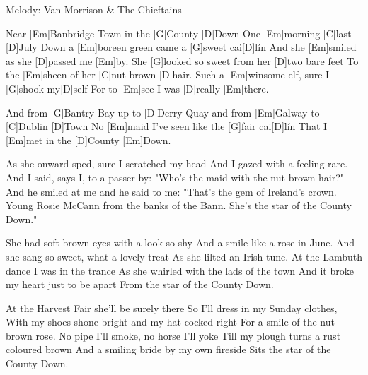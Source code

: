 Melody: Van Morrison \& The Chieftains


\begin{guitar}
	Near [Em]Banbridge Town in the [G]County [D]Down
	One [Em]morning [C]last [D]July
	Down a [Em]boreen green came a [G]sweet cai[D]lín
	And she [Em]smiled as she [D]passed me [Em]by.
	She [G]looked so sweet from her [D]two bare feet
	To the [Em]sheen of her [C]nut brown [D]hair.
	Such a [Em]winsome elf, sure I [G]shook my[D]self
	For to [Em]see I was [D]really [Em]there.
	
	And from [G]Bantry Bay up to [D]Derry Quay
	and from [Em]Galway to [C]Dublin [D]Town
	No [Em]maid I've seen like the [G]fair cai[D]lín
	That I [Em]met in the [D]County [Em]Down.
	
	As she onward sped, sure I scratched my head
	And I gazed with a feeling rare.
	And I said, says I, to a passer-by:
	"Who's the maid with the nut brown hair?"
	And he smiled at me and he said to me:
	"That's the gem of Ireland's crown.
	Young Rosie McCann from the banks of the Bann.
	She's the star of the County Down."
	
	 
	
	\pagebreak
	
	She had soft brown eyes with a look so shy
	And a smile like a rose in June.
	And she sang so sweet, what a lovely treat
	As she lilted an Irish tune.
	At the Lambuth dance I was in the trance
	As she whirled with the lads of the town
	And it broke my heart just to be apart
	From the star of the County Down.
	
	 
	
	At the Harvest Fair she'll be surely there
	So I'll dress in my Sunday clothes,
	With my shoes shone bright and my hat cocked right
	For a smile of the nut brown rose.
	No pipe I'll smoke, no horse I'll yoke
	Till my plough turns a rust coloured brown
	And a smiling bride by my own fireside
	Sits the star of the County Down.
	
	 
\end{guitar}